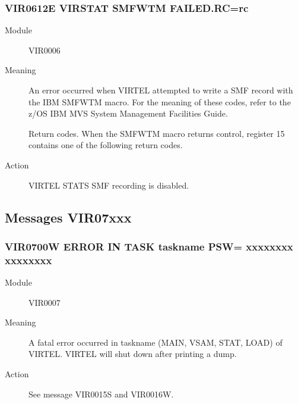 \documentclass[letterpaper,10pt,english]{sphinxmanual}
\begin{document}
\subsubsection{VIR0612E VIRSTAT SMFWTM FAILED.RC=rc}
\label{\detokenize{messages:vir0612e-virstat-smfwtm-failed-rc-rc}}\begin{description}
\item[{Module}] \leavevmode
VIR0006

\item[{Meaning}] \leavevmode
An error occurred when VIRTEL attempted to write a SMF record with the IBM SMFWTM macro. For the meaning of these codes, refer to the z/OS IBM MVS System Management Facilities Guide.

Return codes.
When the SMFWTM macro returns control, register 15 contains one of the following return codes.

\begin{sphinxVerbatim}[commandchars=\\\{\}]
  
                 
\end{sphinxVerbatim}

\item[{Action}] \leavevmode
VIRTEL STATS SMF recording is disabled.

\end{description}


\subsection{Messages VIR07xxx}
\label{\detokenize{messages:messages-vir07xxx}}

\subsubsection{VIR0700W ERROR IN TASK taskname PSW= xxxxxxxx xxxxxxxx}
\label{\detokenize{messages:vir0700w-error-in-task-taskname-psw-xxxxxxxx-xxxxxxxx}}\begin{description}
\item[{Module}] \leavevmode
VIR0007

\item[{Meaning}] \leavevmode
A fatal error occurred in taskname (MAIN, VSAM, STAT, LOAD) of VIRTEL. VIRTEL will shut down after printing a dump.

\item[{Action}] \leavevmode
See message VIR0015S and VIR0016W.

\end{description}
\end{document}
